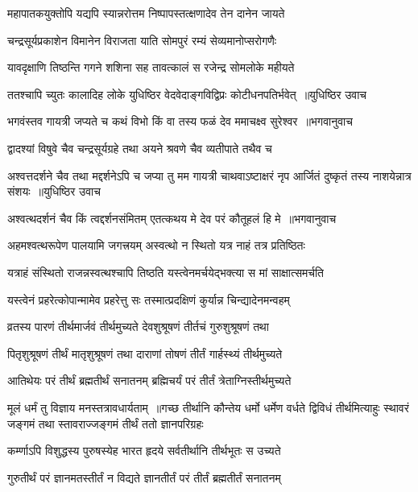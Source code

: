 \twolineshloka
{महापातकयुक्तोपि यद्यपि स्यान्नरोत्तम}
{निष्पापस्तत्क्षणादेव तेन दानेन जायते}


\twolineshloka
{चन्द्रसूर्यप्रकाशेन विमानेन विराजता}
{याति सोमपुरं रम्यं सेव्यमानोप्सरोगणैः}


\twolineshloka
{यावदृक्षाणि तिष्ठन्ति गगने शशिना सह}
{तावत्कालं स रजेन्द्र सोमलोके महीयते}


\threelineshloka
{ततश्चापि च्युतः कालादिह लोके युधिष्ठिर}
{वेदवेदाङ्गविद्विप्रः कोटीधनपतिर्भवेत् ॥युधिष्ठिर उवाच}
{}


\threelineshloka
{भगवंस्तव गायत्री जप्यते च कथं विभो}
{किं वा तस्य फळं देव ममाचक्ष्व सुरेश्वर ॥भगवानुवाच}
{}


\twolineshloka
{द्वादश्यां विषुवे चैव चन्द्रसूर्यग्रहे तथा}
{अयने श्रवणे चैव व्यतीपाते तथैव च}


\fourlineindentedshloka
{अश्वत्तदर्शने चैव तथा मद्दर्शनेऽपि च}
{जप्या तु मम गायत्री चाथवाऽष्टाक्षरं नृप}
{आर्जितं दुष्कृतं तस्य नाशयेन्नात्र संशयः ॥युधिष्ठिर उवाच}
{}


\threelineshloka
{अश्वत्थदर्शनं चैव किं त्वद्दर्शनसंमितम्}
{एतत्कथय मे देव परं कौतूहलं हि मे ॥भगवानुवाच}
{}


\twolineshloka
{अहमश्वत्थरूपेण पालयामि जगत्त्रयम्}
{अस्वत्थो न स्थितो यत्र नाहं तत्र प्रतिष्ठितः}


\twolineshloka
{यत्राहं संस्थितो राजन्नस्वत्थश्चापि तिष्ठति}
{यस्त्वेनमर्चयेद्भक्त्या स मां साक्षात्समर्चति}


\twolineshloka
{यस्त्वेनं प्रहरेत्कोपान्मामेव प्रहरेत्तु सः}
{तस्मात्प्रदक्षिणं कुर्यान्न चिन्द्यादेनमन्वहम्}


\twolineshloka
{व्रतस्य पारणं तीर्थमार्जवं तीर्थमुच्यते}
{देवशुश्रूषणं तीर्तचं गुरुशुश्रूषणं तथा}


\twolineshloka
{पितृशुश्रूषणं तीर्थं मातृशुश्रूषणं तथा}
{दाराणां तोषणं तीर्तं गार्हस्थ्यं तीर्थमुच्यते}


\twolineshloka
{आतिथेयः परं तीर्थं ब्रह्मतीर्थं सनातनम्}
{ब्रह्मिचर्यं परं तीर्तं त्रेताग्निस्तीर्थमुच्यते}


मूलं धर्मं तु विज्ञाय मनस्तत्रावधार्यताम् ॥गच्छ तीर्थानि कौन्तेय धर्मो धर्मेण वर्धते
\twolineshloka
{द्विविधं तीर्थमित्याहुः स्थावरं जङ्गमं तथा}
{स्तावराज्जङ्गमं तीर्थं ततो ज्ञानपरिग्रहः}


\twolineshloka
{कर्म्णाऽपि विशुद्धस्य पुरुषस्येह भारत}
{हृदये सर्वतीर्थानि तीर्थभूतः स उच्यते}


\twolineshloka
{गुरुतीर्थं परं ज्ञानमतस्तीर्तं न विद्यते}
{ज्ञानतीर्तं परं तीर्तं ब्रह्मतीर्तं सनातनम्}


